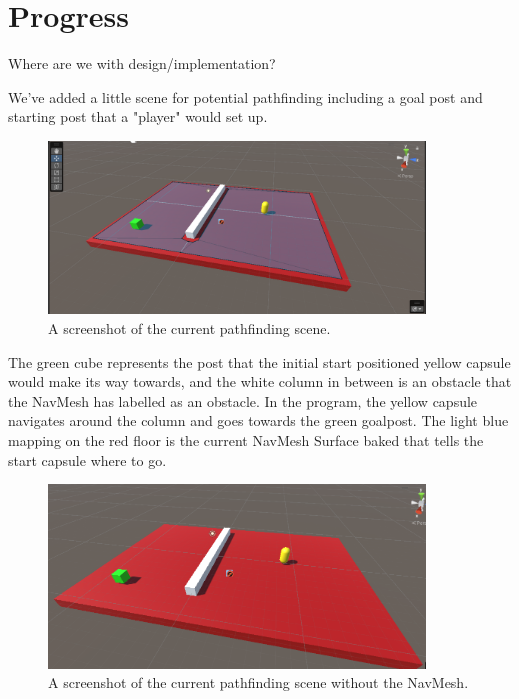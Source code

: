\section{Progress}

Where are we with design/implementation?

We've added a little scene for potential pathfinding including a goal post and starting post that a "player" would set up. 

\begin{figure}[htb]
    \centering
    \includegraphics[width=10cm]{../Images/Update2/PathFind.png}
       \caption{A screenshot of the current pathfinding scene.}
           \label{Fig:PathfindingScene}
  \end{figure}

\begin{flushleft}
The green cube represents the post that the initial start positioned yellow capsule would make its way towards, and the white column in between is an obstacle that the NavMesh has labelled as an obstacle. In the program, the yellow capsule navigates around the column and goes towards the green goalpost. The light blue mapping on the red floor is the current NavMesh Surface baked that tells the start capsule where to go.
\end{flushleft}

\begin{figure}[!ht]
    \centering
    \includegraphics[width=10cm]{../Images/Update2/NoNavMesh.png}
       \caption{A screenshot of the current pathfinding scene without the NavMesh.}
           \label{Fig:NoNavMesh}
   \end{figure}

